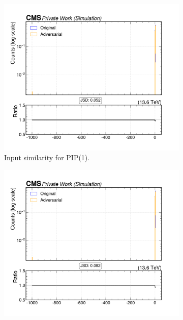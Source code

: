 \begin{figure}[htbp]
  \centering
  \begin{subfigure}[t]{0.32\textwidth}
    \includegraphics[width=\linewidth]{media/output/features/compare/intprob_1/cmp_global_features_TagVarCSV_vertexCategory.pdf}
    \caption{Input similarity for PIP(1).}
  \end{subfigure}\hfill
  \begin{subfigure}[t]{0.32\textwidth}
    \includegraphics[width=\linewidth]{media/output/features/compare/intprob_2/cmp_global_features_TagVarCSV_vertexCategory.pdf}

\end{subfigure}
\end{figure}
